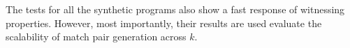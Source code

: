 The tests for all the synthetic programs also show a fast response of witnessing properties. However, most importantly, their results are used evaluate the scalability of match pair generation across $k$. 

 



